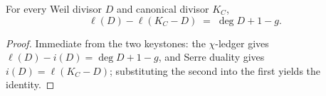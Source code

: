 \begin{theorem}
  \label{thm:adelic_riemannRoch}
  \notready
  For every Weil divisor \(D\) and canonical divisor \(K_C\),
  \[
    \ell(D) - \ell(K_C - D) \;=\; \deg D + 1 - g .
  \]
\end{theorem}
\begin{proof}
  Immediate from the two keystones: the \(\chi\)-ledger
   gives
  \(\ell(D) - i(D) = \deg D + 1 - g\), and Serre duality
   gives \(i(D) = \ell(K_C - D)\);
  substituting the second into the first yields the identity.
\end{proof}
